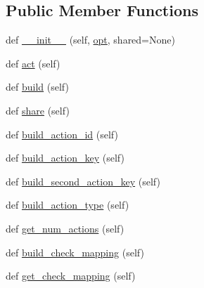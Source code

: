 \subsection*{Public Member Functions}
\begin{DoxyCompactItemize}
\item 
def \hyperlink{classmastering__the__dungeon_1_1agents_1_1graph__world2_1_1agents_1_1DataAgentBase_a73be4f352d7555cbfd139429342aec35}{\+\_\+\+\_\+init\+\_\+\+\_\+} (self, \hyperlink{classparlai_1_1core_1_1agents_1_1Agent_ab3b45d2754244608c75d4068b90cd051}{opt}, shared=None)
\item 
def \hyperlink{classmastering__the__dungeon_1_1agents_1_1graph__world2_1_1agents_1_1DataAgentBase_a21a502f34655840f3bdb22551e48450b}{act} (self)
\item 
def \hyperlink{classmastering__the__dungeon_1_1agents_1_1graph__world2_1_1agents_1_1DataAgentBase_a05f05160a9624af190be6eea457d8fe4}{build} (self)
\item 
def \hyperlink{classmastering__the__dungeon_1_1agents_1_1graph__world2_1_1agents_1_1DataAgentBase_a0f3c2cec58fa1ff8079b7ded3c9c0ded}{share} (self)
\item 
def \hyperlink{classmastering__the__dungeon_1_1agents_1_1graph__world2_1_1agents_1_1DataAgentBase_add9ea9762bf098cda7e179bc7c19cf6d}{build\+\_\+action\+\_\+id} (self)
\item 
def \hyperlink{classmastering__the__dungeon_1_1agents_1_1graph__world2_1_1agents_1_1DataAgentBase_a1f73b4d45203915df4938899046ff0eb}{build\+\_\+action\+\_\+key} (self)
\item 
def \hyperlink{classmastering__the__dungeon_1_1agents_1_1graph__world2_1_1agents_1_1DataAgentBase_a7841fcde768420a09fe41f1bb9483774}{build\+\_\+second\+\_\+action\+\_\+key} (self)
\item 
def \hyperlink{classmastering__the__dungeon_1_1agents_1_1graph__world2_1_1agents_1_1DataAgentBase_a45e963a17f2639a29f35f66e858bcb86}{build\+\_\+action\+\_\+type} (self)
\item 
def \hyperlink{classmastering__the__dungeon_1_1agents_1_1graph__world2_1_1agents_1_1DataAgentBase_ab09548bc8631333116fefdc79d391651}{get\+\_\+num\+\_\+actions} (self)
\item 
def \hyperlink{classmastering__the__dungeon_1_1agents_1_1graph__world2_1_1agents_1_1DataAgentBase_a67cb2755dc42ed432cec7e6b7efa2f98}{build\+\_\+check\+\_\+mapping} (self)
\item 
def \hyperlink{classmastering__the__dungeon_1_1agents_1_1graph__world2_1_1agents_1_1DataAgentBase_a12d7c1414638f97db8b7388c3121d951}{get\+\_\+check\+\_\+mapping} (self)

\end{DoxyCompactItemize}
